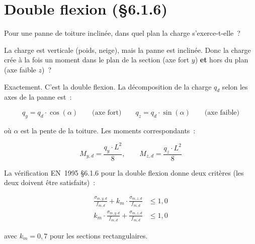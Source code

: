 \section{Double flexion (\S{}6.1.6)}

\begin{maitre}
Pour une panne de toiture inclin\'ee, dans quel plan la charge
s'exerce-t-elle~?
\end{maitre}

\begin{apprenti}
La charge est verticale (poids, neige), mais la panne est inclin\'ee.
Donc la charge cr\'ee \`a la fois un moment dans le plan de la section
(axe fort $y$) \textbf{et} hors du plan (axe faible $z$)~?
\end{apprenti}

\begin{maitre}
Exactement. C'est la double flexion.
La d\'ecomposition de la charge $q_d$ selon les axes de la panne est~:
\end{maitre}

\begin{equation}
q_y = q_d \cdot \cos(\alpha) \qquad \text{(axe fort)}
\qquad
q_z = q_d \cdot \sin(\alpha) \qquad \text{(axe faible)}
\label{eq:decomp}
\end{equation}

\noindent o\`u $\alpha$ est la pente de la toiture. Les moments correspondants~:

\begin{equation}
M_{y,d} = \frac{q_y \cdot L^2}{8}, \qquad M_{z,d} = \frac{q_z \cdot L^2}{8}
\end{equation}

La v\'erification EN~1995 \S{}6.1.6 pour la double flexion donne
deux crit\`eres (les deux doivent \^etre satisfaits)~:

\begin{align}
\frac{\sigma_{m,y,d}}{f_{m,d}} + k_m \cdot \frac{\sigma_{m,z,d}}{f_{m,d}} &\leq 1{,}0
\label{eq:biaxial1}\\
k_m \cdot \frac{\sigma_{m,y,d}}{f_{m,d}} + \frac{\sigma_{m,z,d}}{f_{m,d}} &\leq 1{,}0
\label{eq:biaxial2}
\end{align}

\noindent avec $k_m = 0{,}7$ pour les sections rectangulaires.

